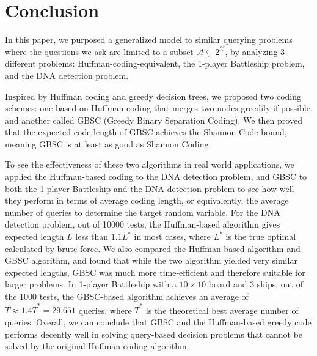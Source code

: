
\section{Conclusion}

In this paper, we purposed a generalized model to similar querying problems where the questions we ask are limited to a subset $\mathscr{A} \subsetneq 2^\mathcal{X}$, by analyzing 3 different problems: Huffman-coding-equivalent, the 1-player Battleship problem, and the DNA detection problem. 

Inspired by Huffman coding and greedy decision trees, we proposed two coding schemes: one based on Huffman coding that merges two nodes greedily if possible, and another called GBSC (Greedy Binary Separation Coding). We then proved that the expected code length of GBSC achieves the Shannon Code bound, meaning GBSC is at least as good as Shannon Coding. 

To see the effectiveness of these two algorithms in real world applications, we applied the Huffman-based coding to the DNA detection problem, and GBSC to both the 1-player Battleship and the DNA detection problem to see how well they perform in terms of average coding length, or equivalently, the average number of queries to determine the target random variable. For the DNA detection problem, out of \num{10000} tests, the Huffman-based algorithm gives expected length $L$ less than $1.1L^*$ in most cases, where $L^*$ is the true optimal calculated by brute force. We also compared the Huffman-based algorithm and GBSC algorithm, and found that while the two algorithm yielded very similar expected lengths, GBSC was much more time-efficient and therefore suitable for larger problems. In 1-player Battleship with a $10\times 10$ board and 3 ships, out of the \num{1000} tests, the GBSC-based algorithm achieves an average of $\bar{T}\approx 1.4 \bar{T}^*=29.651$ queries, where $\bar{T}^*$ is the theoretical best average number of queries. Overall, we can conclude that GBSC and the Huffman-based greedy code performs decently well in solving query-based decision problems that cannot be solved by the original Huffman coding algorithm.
